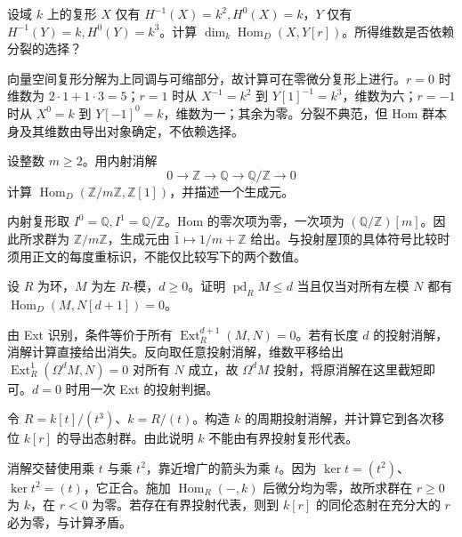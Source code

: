 \begin{exercise}\label{b4:ex:17-field-two-degrees}
	设域 \(k\) 上的复形 \(X\) 仅有 \(H^{-1}(X)=k^2,H^0(X)=k\)，\(Y\) 仅有 \(H^{-1}(Y)=k,H^0(Y)=k^3\)。计算 \(\dim_k\operatorname{Hom}_D(X,Y[r])\)。所得维数是否依赖分裂的选择？
\end{exercise}
\begin{solution}
	向量空间复形分解为上同调与可缩部分，故计算可在零微分复形上进行。\(r=0\) 时维数为 \(2\cdot1+1\cdot3=5\)；\(r=1\) 时从 \(X^{-1}=k^2\) 到 \(Y[1]^{-1}=k^3\)，维数为六；\(r=-1\) 时从 \(X^0=k\) 到 \(Y[-1]^0=k\)，维数为一；其余为零。分裂不典范，但 Hom 群本身及其维数由导出对象确定，不依赖选择。
\end{solution}

\begin{exercise}\label{b4:ex:17-injective-cyclic}
	设整数 \(m\ge2\)。用内射消解
	\[
		0\to\mathbb Z\to\mathbb Q\to\mathbb Q/\mathbb Z\to0
	\]
	计算 \(\operatorname{Hom}_D(\mathbb Z/m\mathbb Z,\mathbb Z[1])\)，并描述一个生成元。
\end{exercise}
\begin{solution}
	内射复形取 \(I^0=\mathbb Q,I^1=\mathbb Q/\mathbb Z\)。Hom 的零次项为零，一次项为 \((\mathbb Q/\mathbb Z)[m]\)。因此所求群为 \(\mathbb Z/m\mathbb Z\)，生成元由 \(\bar1\mapsto1/m+\mathbb Z\) 给出。与投射屋顶的具体符号比较时须用正文的每度重标识，不能仅比较写下的两个数值。
\end{solution}

\begin{exercise}\label{b4:ex:17-projective-dimension}
	设 \(R\) 为环，\(M\) 为左 \(R\)-模，\(d\ge0\)。证明 \(\operatorname{pd}_R M\le d\) 当且仅当对所有左模 \(N\) 都有 \(\operatorname{Hom}_D(M,N[d+1])=0\)。
\end{exercise}
\begin{solution}
	由 Ext 识别，条件等价于所有 \(\operatorname{Ext}_R^{d+1}(M,N)=0\)。若有长度 \(d\) 的投射消解，消解计算直接给出消失。反向取任意投射消解，维数平移给出 \(\operatorname{Ext}_R^1(\Omega^dM,N)=0\) 对所有 \(N\) 成立，故 \(\Omega^dM\) 投射，将原消解在这里截短即可。\(d=0\) 时用一次 Ext 的投射判据。
\end{solution}

\begin{exercise}\label{b4:ex:17-cubic-truncated}
	令 \(R=k[t]/(t^3)\)、\(k=R/(t)\)。构造 \(k\) 的周期投射消解，并计算它到各次移位 \(k[r]\) 的导出态射群。由此说明 \(k\) 不能由有界投射复形代表。
\end{exercise}
\begin{solution}
	消解交替使用乘 \(t\) 与乘 \(t^2\)，靠近增广的箭头为乘 \(t\)。因为 \(\ker t=(t^2)\)、\(\ker t^2=(t)\)，它正合。施加 \(\operatorname{Hom}_R(-,k)\) 后微分均为零，故所求群在 \(r\ge0\) 为 \(k\)，在 \(r<0\) 为零。若存在有界投射代表，则到 \(k[r]\) 的同伦态射在充分大的 \(r\) 必为零，与计算矛盾。
\end{solution}

